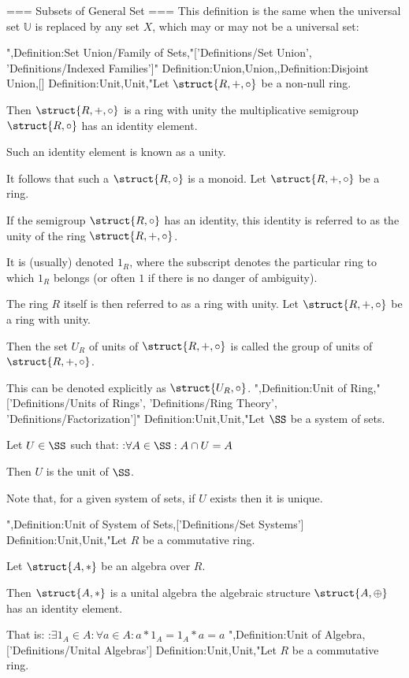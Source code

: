 === Subsets of General Set ===
This definition is the same when the universal set $\mathbb U$ is replaced by any set $X$, which may or may not be a universal set:

",Definition:Set Union/Family of Sets,"['Definitions/Set Union', 'Definitions/Indexed Families']"
Definition:Union,Union,,Definition:Disjoint Union,[]
Definition:Unit,Unit,"Let $\struct {R, +, \circ}$ be a non-null ring.

Then $\struct {R, +, \circ}$ is a ring with unity  the multiplicative semigroup $\struct {R, \circ}$ has an identity element.

Such an identity element is known as a unity.


It follows that such a $\struct {R, \circ}$ is a monoid.
Let $\struct {R, +, \circ}$ be a ring.

If the semigroup $\struct {R, \circ}$ has an identity, this identity is referred to as the unity of the ring $\struct {R, +, \circ}$.

It is (usually) denoted $1_R$, where the subscript denotes the particular ring to which $1_R$ belongs (or often $1$ if there is no danger of ambiguity).


The ring $R$ itself is then referred to as a ring with unity.
Let $\struct {R, +, \circ}$ be a ring with unity.


Then the set $U_R$ of units of $\struct {R, +, \circ}$ is called the group of units of $\struct {R, +, \circ}$.


This can be denoted explicitly as $\struct {U_R, \circ}$.
",Definition:Unit of Ring,"['Definitions/Units of Rings', 'Definitions/Ring Theory', 'Definitions/Factorization']"
Definition:Unit,Unit,"Let $\SS$ be a system of sets.

Let $U \in \SS$ such that:
:$\forall A \in \SS: A \cap U = A$


Then $U$ is the unit of $\SS$.


Note that, for a given system of sets, if $U$ exists then it is unique.

",Definition:Unit of System of Sets,['Definitions/Set Systems']
Definition:Unit,Unit,"Let $R$ be a commutative ring.

Let $\struct {A, *}$ be an algebra over $R$. 


Then $\struct {A, *}$ is a unital algebra  the algebraic structure $\struct {A, \oplus}$ has an identity element.

That is:
:$\exists 1_A \in A: \forall a \in A: a * 1_A = 1_A * a = a$
",Definition:Unit of Algebra,['Definitions/Unital Algebras']
Definition:Unit,Unit,"Let $R$ be a commutative ring.

